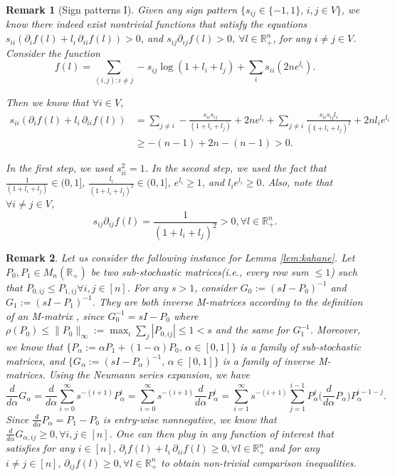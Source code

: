 \documentclass[a4paper, 11pt]{article}
\newtheorem{rem}{Remark}[thm]
\begin{document}
\vspace{.3em} \begin{rem}[Sign patterns I]
Given any sign pattern $\{s_{ij}\in\{-1,1\},\, i,j\in V\}$, we know there indeed
exist nontrivial functions that
satisfy the equations $s_{ii}(\partial_i f(l)+l_i\,\partial_{ii}f(l))> 0$, and $s_{ij}\partial_{ij}f(l)>0$, $\forall l\in \mathbb{R}_+^n$, for any $i\neq j\in V$. Consider the function
\[f(l)=\sum_{(i,j):i\neq j}-s_{ij}\log(1+l_i+l_j)+\sum_i s_{ii}(2ne^{l_i}).\]

Then we know that $\forall i\in V$,
\begin{equation*}
\begin{aligned}
s_{ii}(\partial_i f(l)+l_i\,\partial_{ii}f(l))
&= \sum_{j\neq i}-\frac{s_{ii}s_{ij}}{(1+l_i+l_j)}+2ne^{l_i}+\sum_{j\neq i}\frac{s_{ii}s_{ij}l_i}{(1+l_i+l_j)^2}+2nl_ie^{l_i}\\
&\geq -(n-1)+2n -(n-1)>0.
\end{aligned}
\end{equation*}

In the first step, we used $s_{ii}^2=1$. In the second step, we used the fact that $\frac{1}{(1+l_i+l_j)}\in(0,1]$, $\frac{l_i}{(1+l_i+l_j)^2}\in(0,1]$, $e^{l_i}\geq 1$, and $l_ie^{l_i}\geq 0$. Also, note that $\forall i\neq j\in V$,
\[s_{ij}\partial_{ij}f(l)=\frac{1}{(1+l_i+l_j)^2}>0, \forall l\in\mathbb{R}_+^n.\]
\end{rem}

\vspace{.3em} \begin{rem}
Let us consider the following instance for Lemma \ref{lem:kahane}. Let $P_0, P_1\in M_n(\mathbb{R}_+)$ be two sub-stochastic matrices(i.e., every row sum $\leq 1$) such that $P_{0,ij}\leq P_{1,ij}\forall i,j\in[n]$. For any $s>1$, consider $G_0:=(sI-P_0)^{-1}$ and $G_1:=(sI-P_1)^{-1}$. They are both inverse M-matrices according to the definition of an M-matrix \cite{plemmons77}, since $G_0^{-1}=sI-P_0$ where $\rho(P_0)\leq \|P_0\|_\infty:=\max_i\sum_j |P_{0,ij}|\leq 1<s$ and the same for $G_1^{-1}$. Moreover, we know that $\{P_\alpha:=\alpha P_1+(1-\alpha)P_0,\,\alpha\in[0,1]\}$ is a family of sub-stochastic matrices, and $\{G_\alpha:=(sI-P_\alpha)^{-1},\,\alpha\in[0,1]\}$ is a family of inverse M-matrices. Using the Neumann series expansion, we have
    \[\frac{d}{d\alpha}G_\alpha=\frac{d}{d\alpha}\sum_{i=0}^\infty s^{-(i+1)}P_\alpha^i=\sum_{i=0}^\infty s^{-(i+1)}\frac{d}{d\alpha}P_\alpha^i=\sum_{i=1}^\infty s^{-(i+1)}\sum_{j=1}^{i-1}P_\alpha^{j}\Big(\frac{d}{d\alpha}P_\alpha\Big)P_\alpha^{i-1-j}.\]
Since $\frac{d}{d\alpha}P_\alpha=P_1-P_0$ is entry-wise nonnegative, we know that $\frac{d}{d\alpha}G_{\alpha,ij}\geq 0,\forall i,j\in[n]$. One can then plug in any function of interest that satisfies for any $i\in[n],\,\partial_i f(l)+l_i\,\partial_{ii}f(l)\geq 0, \forall l\in\mathbb{R}_+^n$ and for any $i\neq j\in[n],\,\partial_{ij} f(l)\geq 0, \forall l\in\mathbb{R}_+^n$ to obtain non-trivial comparison inequalities.
\end{rem}
\end{document}
